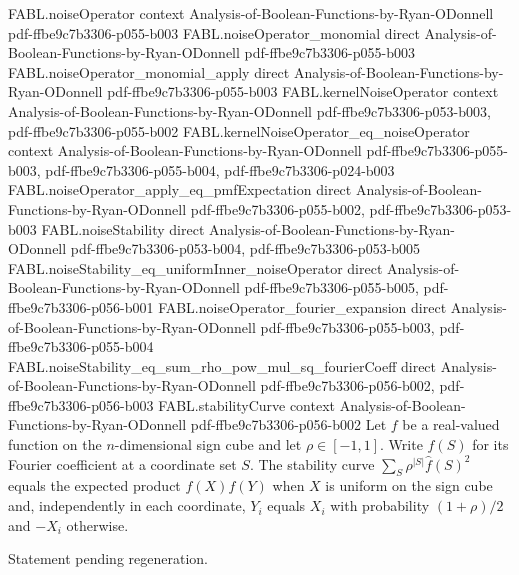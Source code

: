 \begin{theorem}
\proofstep
  {FABL.noiseOperator}
  {context}
  {Analysis-of-Boolean-Functions-by-Ryan-ODonnell}
  {pdf-ffbe9c7b3306-p055-b003}
\proofstep
  {FABL.noiseOperator_monomial}
  {direct}
  {Analysis-of-Boolean-Functions-by-Ryan-ODonnell}
  {pdf-ffbe9c7b3306-p055-b003}
\proofstep
  {FABL.noiseOperator_monomial_apply}
  {direct}
  {Analysis-of-Boolean-Functions-by-Ryan-ODonnell}
  {pdf-ffbe9c7b3306-p055-b003}
\proofstep
  {FABL.kernelNoiseOperator}
  {context}
  {Analysis-of-Boolean-Functions-by-Ryan-ODonnell}
  {pdf-ffbe9c7b3306-p053-b003,
    pdf-ffbe9c7b3306-p055-b002}
\proofstep
  {FABL.kernelNoiseOperator_eq_noiseOperator}
  {context}
  {Analysis-of-Boolean-Functions-by-Ryan-ODonnell}
  {pdf-ffbe9c7b3306-p055-b003,
    pdf-ffbe9c7b3306-p055-b004,
    pdf-ffbe9c7b3306-p024-b003}
\proofstep
  {FABL.noiseOperator_apply_eq_pmfExpectation}
  {direct}
  {Analysis-of-Boolean-Functions-by-Ryan-ODonnell}
  {pdf-ffbe9c7b3306-p055-b002,
    pdf-ffbe9c7b3306-p053-b003}
\proofstep
  {FABL.noiseStability}
  {direct}
  {Analysis-of-Boolean-Functions-by-Ryan-ODonnell}
  {pdf-ffbe9c7b3306-p053-b004,
    pdf-ffbe9c7b3306-p053-b005}
\proofstep
  {FABL.noiseStability_eq_uniformInner_noiseOperator}
  {direct}
  {Analysis-of-Boolean-Functions-by-Ryan-ODonnell}
  {pdf-ffbe9c7b3306-p055-b005,
    pdf-ffbe9c7b3306-p056-b001}
\proofstep
  {FABL.noiseOperator_fourier_expansion}
  {direct}
  {Analysis-of-Boolean-Functions-by-Ryan-ODonnell}
  {pdf-ffbe9c7b3306-p055-b003,
    pdf-ffbe9c7b3306-p055-b004}
\proofstep
  {FABL.noiseStability_eq_sum_rho_pow_mul_sq_fourierCoeff}
  {direct}
  {Analysis-of-Boolean-Functions-by-Ryan-ODonnell}
  {pdf-ffbe9c7b3306-p056-b002,
    pdf-ffbe9c7b3306-p056-b003}
\proofstep
  {FABL.stabilityCurve}
  {context}
  {Analysis-of-Boolean-Functions-by-Ryan-ODonnell}
  {pdf-ffbe9c7b3306-p056-b002}
Let $f$ be a real-valued function on the $n$-dimensional sign cube and let
$\rho\in[-1,1]$. Write $\widehat f(S)$ for its Fourier coefficient at a coordinate set
$S$. The stability curve $\sum_S \rho^{|S|}\widehat f(S)^2$ equals the expected product
$f(X)f(Y)$ when $X$ is uniform on the sign cube and, independently in each coordinate,
$Y_i$ equals $X_i$ with probability $(1+\rho)/2$ and $-X_i$ otherwise.
\end{theorem}

\begin{theorem}
\label{FABL.hasDerivAt_stabilityCurve}
\leanok
{}
Statement pending regeneration.
\end{theorem}

